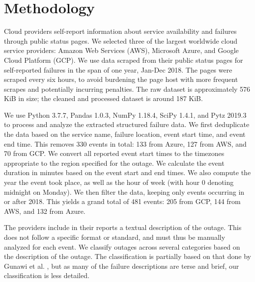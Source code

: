\section{Methodology}
Cloud providers self-report information about service availability and failures through public status pages.
We selected three of the largest worldwide cloud service providers: Amazon Web Services (AWS), Microsoft Azure, and Google Cloud Platform (GCP).
We use data scraped from their public status pages for self-reported failures \cite{awsFeed, gcpFeed, azureFeed} in the span of one year, Jan-Dec 2018.
The pages were scraped every six hours, to avoid burdening the page host with more frequent scrapes and potentially incurring penalties.
The raw dataset is approximately 576 KiB in size; the cleaned and processed dataset is around 187 KiB.

We use Python 3.7.7, Pandas 1.0.3, NumPy 1.18.4, SciPy 1.4.1, and Pytz 2019.3 to process and analyze the extracted structured failure data.
We first deduplicate the data based on the service name, failure location, event start time, and event end time.
This removes 330 events in total: 133 from Azure, 127 from AWS, and 70 from GCP.
We convert all reported event start times to the timezones appropriate to the region specified for the outage.
We calculate the event duration in minutes based on the event start and end times.
We also compute the year the event took place, as well as the hour of week (with hour 0 denoting midnight on Monday).
We then filter the data, keeping only events occurring in or after 2018. %
This yields a grand total of 481 events: 205 from GCP, 144 from AWS, and 132 from Azure.

The providers include in their reports a textual description of the outage.
This does not follow a specific format or standard, and must thus be manually analyzed for each event.
We classify outages across several categories based on the description of the outage.
The classification is partially based on that done by Gunawi et al. \cite{gunawi2016, gunawi2014}, but as many of the failure descriptions are terse and brief, our classification is less detailed.

